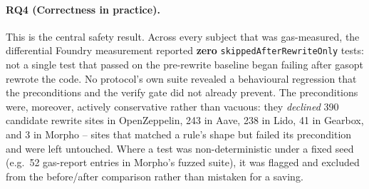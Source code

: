 \paragraph{RQ4 (Correctness in practice).}
This is the central safety result. Across every subject that was gas-measured, the
differential Foundry measurement reported \textbf{zero} \texttt{skippedAfterRewriteOnly}
tests: not a single test that passed on the pre-rewrite baseline began failing after gasopt
rewrote the code. No protocol's own suite revealed a behavioural regression that the
preconditions and the verify gate did not already prevent. The preconditions were, moreover,
actively conservative rather than vacuous: they \emph{declined} 390 candidate rewrite sites
in OpenZeppelin, 243 in Aave, 238 in Lido, 41 in Gearbox, and 3 in Morpho -- sites that
matched a rule's shape but failed its precondition and were left untouched. Where a test was
non-deterministic under a fixed seed (e.g.\ 52 gas-report entries in Morpho's fuzzed suite),
it was flagged and excluded from the before/after comparison rather than mistaken for a
saving.

